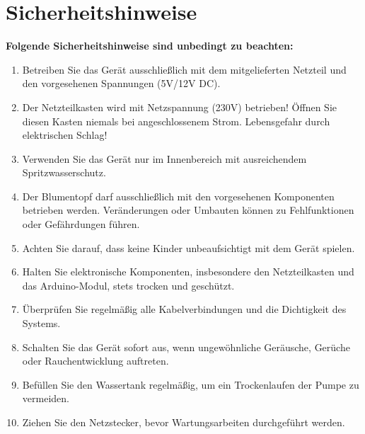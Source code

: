 \section{Sicherheitshinweise}
\textbf{Folgende Sicherheitshinweise sind unbedingt zu beachten:}\\
\begin{enumerate}
	\item Betreiben Sie das Gerät ausschließlich mit dem mitgelieferten Netzteil und den vorgesehenen Spannungen (5V/12V DC).
	\item Der Netzteilkasten wird mit Netzspannung (230V) betrieben! Öffnen Sie diesen Kasten niemals bei angeschlossenem Strom. Lebensgefahr durch elektrischen Schlag!
	\item Verwenden Sie das Gerät nur im Innenbereich mit ausreichendem Spritzwasserschutz.
	\item Der Blumentopf darf ausschließlich mit den vorgesehenen Komponenten betrieben werden. Veränderungen oder Umbauten können zu Fehlfunktionen oder Gefährdungen führen.
	\item Achten Sie darauf, dass keine Kinder unbeaufsichtigt mit dem Gerät spielen.
	\item Halten Sie elektronische Komponenten, insbesondere den Netzteilkasten und das Arduino-Modul, stets trocken und geschützt.
	\item Überprüfen Sie regelmäßig alle Kabelverbindungen und die Dichtigkeit des Systems.
	\item Schalten Sie das Gerät sofort aus, wenn ungewöhnliche Geräusche, Gerüche oder Rauchentwicklung auftreten.
	\item Befüllen Sie den Wassertank regelmäßig, um ein Trockenlaufen der Pumpe zu vermeiden.
	\item Ziehen Sie den Netzstecker, bevor Wartungsarbeiten durchgeführt werden.
\end{enumerate}

